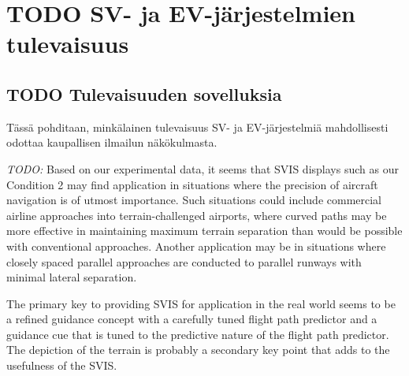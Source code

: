 \documentclass[utf8,bachelor,manualbib]{gradu3}
\begin{document}
\chapter{TODO SV- ja EV-järjestelmien tulevaisuus}

\section{TODO Tulevaisuuden sovelluksia}

Tässä pohditaan, minkälainen tulevaisuus SV- ja EV-järjestelmiä mahdollisesti odottaa kaupallisen ilmailun näkökulmasta.

\emph{TODO:}
Based on our experimental data, it seems that SVIS displays such as our Condition
2 may find application in situations where the precision of aircraft navigation is of
utmost importance. Such situations could include commercial airline approaches
into terrain-challenged airports, where curved paths may be more effective in
maintaining maximum terrain separation than would be possible with conventional
approaches. Another application may be in situations where closely spaced
parallel approaches are conducted to parallel runways with minimal lateral separation. \citep{schnellym2004}

The primary key to
providing SVIS for application in the real world seems to be a refined guidance
concept with a carefully tuned flight path predictor and a guidance cue that is tuned
to the predictive nature of the flight path predictor. The depiction of the terrain is
probably a secondary key point that adds to the usefulness of the SVIS. \citep{schnellym2004}
\end{document}
